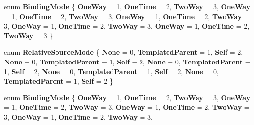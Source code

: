 \begin{DoxyCompactItemize}
\item 
\mbox{\label{namespace_windows_1_1_u_i_1_1_xaml_1_1_data_ae354a03d8fd12bbb128f8758633b2bd8}} 
enum {\bfseries Binding\+Mode} \{ \newline
{\bfseries One\+Way} = 1, 
{\bfseries One\+Time} = 2, 
{\bfseries Two\+Way} = 3, 
{\bfseries One\+Way} = 1, 
\newline
{\bfseries One\+Time} = 2, 
{\bfseries Two\+Way} = 3, 
{\bfseries One\+Way} = 1, 
{\bfseries One\+Time} = 2, 
\newline
{\bfseries Two\+Way} = 3, 
{\bfseries One\+Way} = 1, 
{\bfseries One\+Time} = 2, 
{\bfseries Two\+Way} = 3, 
\newline
{\bfseries One\+Way} = 1, 
{\bfseries One\+Time} = 2, 
{\bfseries Two\+Way} = 3
 \}
\item 
\mbox{\label{namespace_windows_1_1_u_i_1_1_xaml_1_1_data_a5e4ee6dff370c4af738541df52d97b7f}} 
enum {\bfseries Relative\+Source\+Mode} \{ \newline
{\bfseries None} = 0, 
{\bfseries Templated\+Parent} = 1, 
{\bfseries Self} = 2, 
{\bfseries None} = 0, 
\newline
{\bfseries Templated\+Parent} = 1, 
{\bfseries Self} = 2, 
{\bfseries None} = 0, 
{\bfseries Templated\+Parent} = 1, 
\newline
{\bfseries Self} = 2, 
{\bfseries None} = 0, 
{\bfseries Templated\+Parent} = 1, 
{\bfseries Self} = 2, 
\newline
{\bfseries None} = 0, 
{\bfseries Templated\+Parent} = 1, 
{\bfseries Self} = 2
 \}
\item 
\mbox{\label{namespace_windows_1_1_u_i_1_1_xaml_1_1_data_ae354a03d8fd12bbb128f8758633b2bd8}} 
enum {\bfseries Binding\+Mode} \{ \newline
{\bfseries One\+Way} = 1, 
{\bfseries One\+Time} = 2, 
{\bfseries Two\+Way} = 3, 
{\bfseries One\+Way} = 1, 
\newline
{\bfseries One\+Time} = 2, 
{\bfseries Two\+Way} = 3, 
{\bfseries One\+Way} = 1, 
{\bfseries One\+Time} = 2, 
\newline
{\bfseries Two\+Way} = 3, 
{\bfseries One\+Way} = 1, 
{\bfseries One\+Time} = 2, 
{\bfseries Two\+Way} = 3, 
\newline

\end{DoxyCompactItemize}
